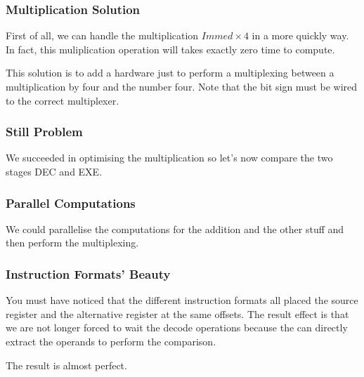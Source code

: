 
\begin{frame}
  \frametitle{Multiplication Solution}

  First of all, we can handle the multiplication \textbf{$Immed \times 4$}
  in a more quickly way. In fact, this muliplication operation will takes
  exactly zero time to compute.

  \-

  This solution is to add a hardware just to perform a multiplexing
  between a multiplication by four and the number four. Note that the bit
  sign must be wired to the correct multiplexer.

  \begin{center}
  \end{center}
\end{frame}


\begin{frame}
  \frametitle{Still Problem}

  We succeeded in optimising the multiplication so let's now compare the
  two stages DEC and EXE.

  \begin{center}
  \end{center}
\end{frame}


\begin{frame}
  \frametitle{Parallel Computations}

  We could parallelise the computations for the addition and the
  other stuff and then perform the multiplexing.

  \begin{center}
  \end{center}
\end{frame}


\begin{frame}
  \frametitle{Instruction Formats' Beauty}

  You must have noticed that the different instruction formats all placed
  the source register and the alternative register at the same offsets. The
  result effect is that we are not longer forced to wait the decode
  operations because the can directly extract the operands to perform
  the comparison.

  \begin{center}
  \end{center}

  The result is almost perfect.
\end{frame}

